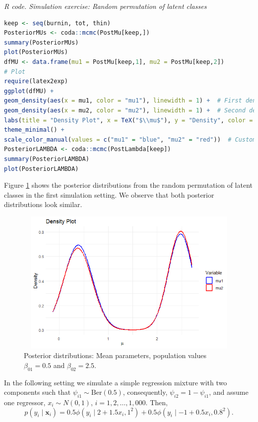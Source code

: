 \begin{tcolorbox}[enhanced,width=4.67in,center upper,
	fontupper=\large\bfseries,drop shadow southwest,sharp corners]
	\textit{R code. Simulation exercise: Random permutation of latent classes}
	\begin{VF}
		\begin{lstlisting}[language=R]
keep <- seq(burnin, tot, thin)
PosteriorMUs <- coda::mcmc(PostMu[keep,])
summary(PosteriorMUs)
plot(PosteriorMUs)
dfMU <- data.frame(mu1 = PostMu[keep,1], mu2 = PostMu[keep,2])
# Plot
require(latex2exp)
ggplot(dfMU) +
geom_density(aes(x = mu1, color = "mu1"), linewidth = 1) +  # First density plot
geom_density(aes(x = mu2, color = "mu2"), linewidth = 1) +  # Second density plot
labs(title = "Density Plot", x = TeX("$\\mu$"), y = "Density", color = "Variable") +
theme_minimal() +
scale_color_manual(values = c("mu1" = "blue", "mu2" = "red"))  # Custom colors
PosteriorLAMBDA <- coda::mcmc(PostLambda[keep])
summary(PosteriorLAMBDA)
plot(PosteriorLAMBDA)
		\end{lstlisting}
	\end{VF}
\end{tcolorbox}

Figure \ref{figMeanPerm} shows the posterior distributions from the random permutation of latent classes in the first simulation setting. We observe that both posterior distributions look similar.

\begin{figure}[!h]
	\includegraphics[width=340pt, height=200pt]{Chapters/chapter11/figures/Permutation.png}
	\caption[List of figure caption goes here]{Posterior distributions: Mean parameters, population values $\beta_{01}=0.5$ and $\beta_{02}=2.5$.}\label{figMeanPerm}
\end{figure}
 
In the following setting we simulate a simple regression mixture with two components such that $\psi_{i1}\sim \text{Ber}(0.5)$, consequently, $\psi_{i2}=1-\psi_{i1}$, and assume one regressor, $x_i\sim N(0,1)$, $i=1,2,\dots,1,000$. Then, 
$$p(y_i \mid \bm{x}_i) = 
0.5 \phi(y_i \mid 2+1.5x_i,1^2)+0.5 \phi(y_i \mid -1+0.5x_i,0.8^2).$$

